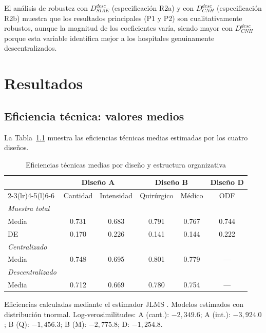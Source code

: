 \documentclass[12pt, a4paper, twoside, openright]{book}
\theoremstyle{plain}
\theoremstyle{definition}
\theoremstyle{remark}
\begin{document}
El análisis de robustez con $D^{desc}_{SIAE}$ (especificación R2a) y con $D^{desc}_{CNH}$ (especificación R2b) muestra que los resultados principales (P1 y P2) son cualitativamente robustos, aunque la magnitud de los coeficientes varía, siendo mayor con $D^{desc}_{CNH}$ porque esta variable identifica mejor a los hospitales genuinamente descentralizados.



\chapter{Resultados}
\label{ch:resultados}

\section{Eficiencia técnica: valores medios}

La Tabla~\ref{tab:te_medias} muestra las eficiencias técnicas medias estimadas por los cuatro diseños.

\begin{table}[htbp]
\centering
\caption{Eficiencias técnicas medias por diseño y estructura organizativa}
\label{tab:te_medias}
\begin{threeparttable}
\begin{tabular}{lccccc}
\toprule
& \multicolumn{2}{c}{\textbf{Diseño A}} &
  \multicolumn{2}{c}{\textbf{Diseño B}} &
  \textbf{Diseño D} \\
\cmidrule(lr){2-3}\cmidrule(lr){4-5}\cmidrule(l){6-6}
& Cantidad & Intensidad & Quirúrgico & Médico & ODF \\
\midrule
\textit{Muestra total} \\
\quad Media & 0.731 & 0.683 & 0.791 & 0.767 & 0.744 \\
\quad DE & 0.170 & 0.226 & 0.141 & 0.144 & 0.222 \\[4pt]
\textit{Centralizado} \\
\quad Media & 0.748 & 0.695 & 0.801 & 0.779 & --- \\[4pt]
\textit{Descentralizado} \\
\quad Media & 0.712 & 0.669 & 0.780 & 0.754 & --- \\
\bottomrule
\end{tabular}
\begin{tablenotes}
  \small
  \item Eficiencias calculadas mediante el estimador JLMS \citep{jondrow1982}. Modelos estimados con distribución tnormal. Log-verosimilitudes: A (cant.): $-2{,}349.6$; A (int.): $-3{,}924.0$; B (Q): $-1{,}456.3$; B (M): $-2{,}775.8$; D: $-1{,}254.8$.
\end{tablenotes}
\end{threeparttable}
\end{table}
\end{document}
